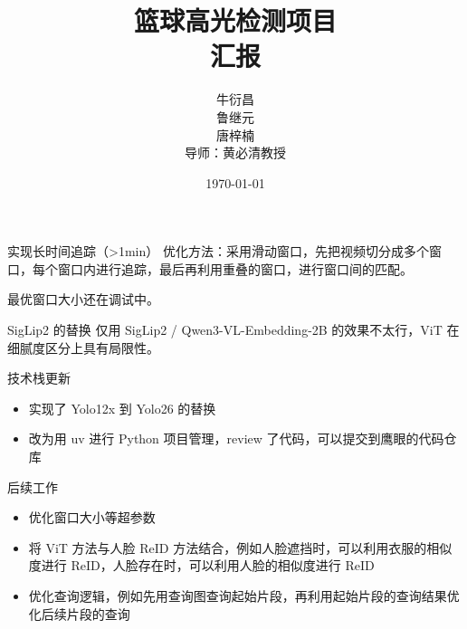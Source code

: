 \documentclass{ctexbeamer}
\title[篮球高光检测]{篮球高光检测项目\\[2mm] 汇报}
\author[唐梓楠]{牛衍昌\\鲁继元\\唐梓楠\\[5mm] 导师：黄必清教授}
\institute[清华大学]{\small 清华大学}
\date{\small \vskip -10pt \today}
\begin{document}
\begin{frame}
  \maketitle
\end{frame}


\begin{frame}{实现长时间追踪（>1min）}
  优化方法：采用滑动窗口，先把视频切分成多个窗口，每个窗口内进行追踪，最后再利用重叠的窗口，进行窗口间的匹配。

  最优窗口大小还在调试中。

\end{frame}

\begin{frame}{SigLip2 的替换}
  仅用 SigLip2 / Qwen3-VL-Embedding-2B 的效果不太行，ViT 在细腻度区分上具有局限性。

\end{frame}

\begin{frame}{技术栈更新}
  \begin{itemize}
    \item 实现了 Yolo12x 到 Yolo26 的替换
    \item 改为用 uv 进行 Python 项目管理，review 了代码，可以提交到鹰眼的代码仓库
  \end{itemize}
\end{frame}

\begin{frame}{后续工作}
  \begin{itemize}
    \item 优化窗口大小等超参数
    \item 将 ViT 方法与人脸 ReID 方法结合，例如人脸遮挡时，可以利用衣服的相似度进行 ReID，人脸存在时，可以利用人脸的相似度进行 ReID
    \item 优化查询逻辑，例如先用查询图查询起始片段，再利用起始片段的查询结果优化后续片段的查询
  \end{itemize}
\end{frame}

\end{document}
